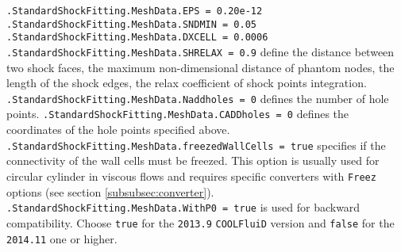 \documentclass[11pt,a4paper,oneside]{article}
\begin{document}
\hspace*{1cm} \texttt{.StandardShockFitting.MeshData.EPS = 0.20e-12}
\newline
\hspace*{1cm} \texttt{.StandardShockFitting.MeshData.SNDMIN = 0.05}
\newline
\hspace*{1cm} \texttt{.StandardShockFitting.MeshData.DXCELL = 0.0006}
\newline
\hspace*{1cm} \texttt{.StandardShockFitting.MeshData.SHRELAX = 0.9}
\newline
\newline
define the distance between two shock faces, the maximum non-dimensional distance of phantom nodes, the length of the shock edges, the relax coefficient of shock points integration.
\newline
\newline
\hspace*{1cm} \texttt{.StandardShockFitting.MeshData.Naddholes = 0}
\newline
\newline
defines the number of hole points.
\newline
\newline
\hspace*{1cm}  \texttt{.StandardShockFitting.MeshData.CADDholes = 0}
\newline
\newline
defines the coordinates of the hole points specified above.
\newline
\newline
\hspace*{1cm}  \texttt{.StandardShockFitting.MeshData.freezedWallCells = true}
\newline
\newline
specifies if the connectivity of the wall cells must be freezed. This option is usually used for circular cylinder in viscous flows and requires specific converters with \texttt{Freez} options (see section \ref{subsubsec:converter}).
\newline
\newline
\hspace*{1cm} \texttt{.StandardShockFitting.MeshData.WithP0 = true}
\newline
\newline
is used for backward compatibility. Choose \texttt{true} for the \texttt{2013.9} \texttt{COOLFluiD} version and \texttt{false} for the \texttt{2014.11} one or higher.
\newline
\end{document}
